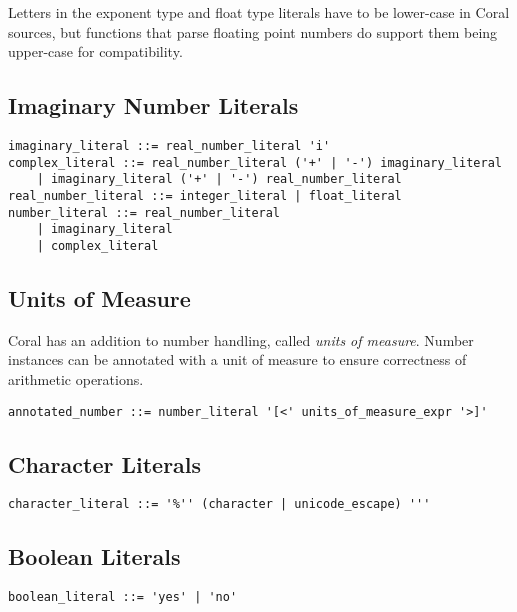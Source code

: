 Letters in the exponent type and float type literals have to be lower-case in Coral sources, but functions that parse floating point numbers do support them being upper-case for compatibility. 

\subsection{Imaginary Number Literals}\label{sec:imaginaryliterals}

\syntax\begin{lstlisting}
imaginary_literal ::= real_number_literal 'i'
complex_literal ::= real_number_literal ('+' | '-') imaginary_literal
	| imaginary_literal ('+' | '-') real_number_literal
real_number_literal ::= integer_literal | float_literal
number_literal ::= real_number_literal
	| imaginary_literal
	| complex_literal
\end{lstlisting}

\subsection{Units of Measure}\label{sec:unitsofmeasuresyntax}

Coral has an addition to number handling, called \textit{units of measure}. Number instances can be annotated with a unit of measure to ensure correctness of arithmetic operations. 

\syntax\begin{lstlisting}
annotated_number ::= number_literal '[<' units_of_measure_expr '>]'
\end{lstlisting}

\subsection{Character Literals}\label{sec:characterliterals}

\syntax\begin{lstlisting}
character_literal ::= '%'' (character | unicode_escape) '''
\end{lstlisting}

\subsection{Boolean Literals}\label{sec:booleanliterals}

\syntax\begin{lstlisting}
boolean_literal ::= 'yes' | 'no'
\end{lstlisting}

